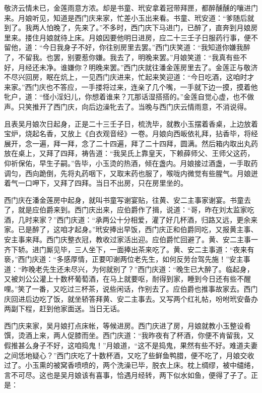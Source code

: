 敬济云情未已，金莲雨意方浓。却是书童、玳安拿着冠带拜匣，都醉醺醺的嚷进门来。月娘听见，知道是西门庆来家，忙差小玉出来看。书童、玳安道：“爹随后就到了。我两人怕晚了，先来了。”不多时，西门庆下马进门，已醉了，直奔到月娘房里来。搂住月娘就待上床。月娘因要他明日进房，应二十三壬子日服药行事，便不留他，道：“今日我身子不好，你往别房里去罢。”西门庆笑道：“我知道你嫌我醉了，不留我。也罢，别要惹你嫌。我去了，明晚来罢。”月娘笑道：“我真有些不好，月经还未净。谁嫌你？明晚来罢。”西门庆就往潘金莲房里去了。金莲正与敬济不尽兴回房，眠在炕上，一见西门庆进来，忙起来笑迎道：“今日吃酒，这咱时才来家。”西门庆也不答应，一手搂将过来，连亲了几个嘴，一手就下边一摸，摸着他牝户，道：“怪小淫妇儿，你想着谁来？兀那话湿搭搭的。”金莲自觉心虚，也不做声。只笑推开了西门庆，向后边澡牝去了。当晚与西门庆云情雨意，不消说得。

且表吴月娘次日起身，正是二十三壬子日，梳洗毕，就教小玉摆着香桌，上边放着宝炉，烧起名香，又放上《白衣观音经》一卷。月娘向西皈依礼拜，拈香毕，将经展开，念一遍，拜一拜，念了二十四遍，拜了二十四拜，圆满。然后箱内取出丸药放在桌上，又拜了四拜，祷告道：“我吴氏上靠皇天，下赖薛师父、王师父这药，仰祈保佑，早生子嗣。”告毕，小玉烫的热酒，倾在盏内。月娘接过酒盏，一手取药调匀，西向跪倒，先将丸药咽下，又取末药也服了，喉咙内微觉有些腥气。月娘迸着气一口呷下，又拜了四拜。当日不出房，只在房里坐的。

西门庆在潘金莲房中起身，就叫书童写谢宴贴，往黄、安二主事家谢宴。书童去了，就是应伯爵来到。西门庆出来，应伯爵作了揖，说道：“哥，昨在刘太监家吃酒，几时来家？”西门庆道：“承两公十分相爱，灌了好几杯酒，归路又远，更余来家。已是醉了，这咱才起身。”玳安捧出早饭，西门庆正和伯爵同吃，又报黄主事、安主事来拜。西门庆整衣冠，教收过家活出迎。应伯爵忙回避了。黄、安二主事一齐下轿。进门厮见毕，三人坐下，一面捧出茶来吃了。黄、安二主事道：“夜来有亵，”西门庆道：“多感厚情，正要叩谢两位老先生，如何反劳台驾先施！”安主事道：“昨晚老先生还未尽兴，为何就别了？”西门庆道：“晚生已大醉了。临起身，又被刘公公灌上十数杯葡萄酒，在马上就要呕，耐得到家，睡到今日还有些不醒哩。”笑了一番，又吃过三杯茶，说些闲话，作别去了。应伯爵也推事故家去。西门庆回进后边吃了饭，就坐轿答拜黄、安二主事去。又写两个红礼帖，吩咐玳安备办两副下程，赶到他家面送。当日无话。

西门庆来家，吴月娘打点床帐，等候进房。西门庆进了房，月娘就教小玉整设肴馔，烫酒上来，两人促膝而坐。西门庆道：“我昨夜有了杯酒，你便不肯留我，又假推甚么身子不好，这咱捣鬼！”月娘道，“这不是捣鬼，果然有些不好。难道夫妻之间恁地疑心？”西门庆吃了十数杯酒，又吃了些鲜鱼鸭腊，便不吃了，月娘交收过了。小玉熏的被窝香喷喷的，两个洗澡已毕，脱衣上床。枕上绸缪，被中缱绻，言不可尽。这也是吴月娘该有喜事，恰遇月经转，两下似水如鱼，便得了子了。正是：

